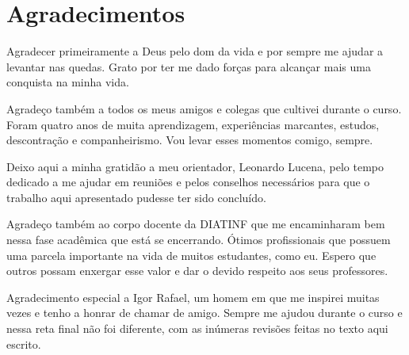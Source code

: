 
\chapter*{Agradecimentos}

Agradecer primeiramente a Deus pelo dom da vida e por sempre me ajudar a levantar nas quedas. Grato por ter me dado forças para alcançar mais uma conquista na minha vida.

Agradeço também a todos os meus amigos e colegas que cultivei durante o curso. Foram quatro anos de muita aprendizagem, experiências marcantes, estudos, descontração e companheirismo. Vou levar esses momentos comigo, sempre.

Deixo aqui a minha gratidão a meu orientador, Leonardo Lucena, pelo tempo dedicado a me ajudar em reuniões e pelos conselhos necessários para que o trabalho aqui apresentado pudesse ter sido concluído.

Agradeço também ao corpo docente da DIATINF que me encaminharam bem nessa fase acadêmica que está se encerrando. Ótimos profissionais que possuem uma parcela importante na vida de muitos estudantes, como eu. Espero que outros possam enxergar esse valor e dar o devido respeito aos seus professores.

Agradecimento especial a Igor Rafael, um homem em que me inspirei muitas vezes e tenho a honrar de chamar de amigo. Sempre me ajudou durante o curso e nessa reta final não foi diferente, com as inúmeras revisões feitas no texto aqui escrito.
            